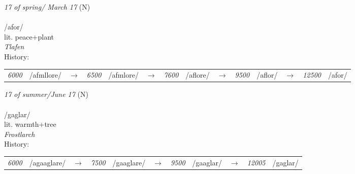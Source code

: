 \vspace{15pt}
\begin{nopagebreak}
 \textit{17 of spring/ March 17} (N)\\
\\
\noindent /{}{\textprimstress}afor/\\
\noindent lit. peace+plant\\
\noindent \textit{Tlafen}\\


\noindent History:

\vspace{-0pt}
\hspace{40pt}
\begin{tabular}{ccc}
\textit{6000} & /{}afmllore/&$\rightarrow$ & \textit{6500} & /{}afmlore/&$\rightarrow$ & \textit{7600} & /{}aflore/&$\rightarrow$ & \textit{9500} & /{}aflor/&$\rightarrow$ & \textit{12500} & /{}afor/& \\
\end{tabular}

\vspace{20pt}\hline

\end{nopagebreak}
\filbreak



\vspace{15pt}
\begin{nopagebreak}
 \textit{17 of summer/June 17} (N)\\
\\
\noindent /g{\textprimstress}aglar/\\
\noindent lit. warmth+tree\\
\noindent \textit{Frostlarch}\\


\noindent History:

\vspace{-0pt}
\hspace{40pt}
\begin{tabular}{ccc}
\textit{6000} & /agaaglare/&$\rightarrow$ & \textit{7500} & /gaaglare/&$\rightarrow$ & \textit{9500} & /gaaglar/&$\rightarrow$ & \textit{12005} & /gaglar/& \\
\end{tabular}

\vspace{20pt}\hline

\end{nopagebreak}
\filbreak



